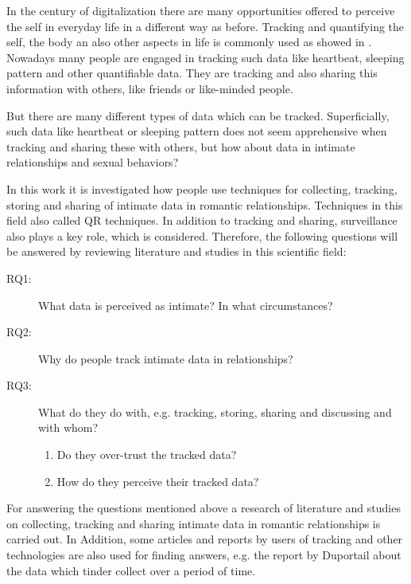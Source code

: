\label{sec:introduction}

In the century of digitalization there are many opportunities offered to perceive the self in everyday life in a different way as before. Tracking and quantifying the self, the body an also other aspects in life is commonly used as showed in \cite{kelly2017inevitable}. Nowadays many people are engaged in tracking such data like heartbeat, sleeping pattern and other quantifiable data. They are tracking and also sharing this information with others, like friends or like-minded people. 



But there are many different types of data which can be tracked. Superficially, such data like heartbeat or sleeping pattern does not seem apprehensive when tracking and sharing these with others, but how about data in intimate relationships and sexual behaviors?


In this work it is investigated how people use techniques for collecting, tracking, storing and sharing of intimate data in romantic relationships. Techniques in this field also called \acl{QR} techniques. In addition to tracking and sharing, surveillance also plays a key role, which is considered.
Therefore, the following questions will be answered by reviewing literature and studies in this scientific field:
 \begin{description}
 	\item[RQ1:] What data is perceived as intimate? In what circumstances?
 	\item[RQ2:] Why do people track intimate data in relationships?
 	\item[RQ3:] What do they do with, e.g. tracking, storing, sharing and discussing and with whom?
 	\begin{enumerate}
 		\item Do they over-trust the tracked data?
 		\item How do they perceive their tracked data?
 	\end{enumerate}
 \end{description}
For answering the questions mentioned above a research of literature and studies on collecting, tracking and sharing intimate data in romantic relationships is carried out. In Addition, some articles and reports by users of tracking and other technologies are also used for finding answers, e.g. the report by Duportail \cite{Duportail2017} about the data which tinder collect over a period of time.


